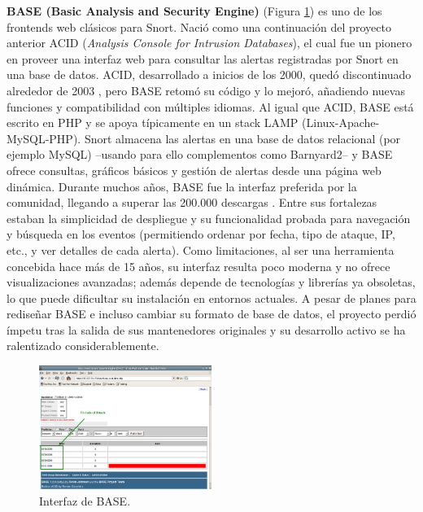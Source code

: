 \documentclass[11pt,a4paper,twoside]{report}
\begin{document}
\textbf{BASE (Basic Analysis and Security Engine)} (Figura \ref{fig:base-interface}) es uno de los frontends web clásicos para Snort. Nació como una continuación del proyecto anterior ACID (\textit{Analysis Console for Intrusion Databases}), el cual fue un pionero en proveer una interfaz web para consultar las alertas registradas por Snort en una base de datos. ACID, desarrollado a inicios de los 2000, quedó discontinuado alrededor de 2003 \cite{SnorbyHelpnet2010}, pero BASE retomó su código y lo mejoró, añadiendo nuevas funciones y compatibilidad con múltiples idiomas. Al igual que ACID, BASE está escrito en PHP y se apoya típicamente en un stack LAMP (Linux-Apache-MySQL-PHP). Snort almacena las alertas en una base de datos relacional (por ejemplo MySQL) –usando para ello complementos como Barnyard2– y BASE ofrece consultas, gráficos básicos y gestión de alertas desde una página web dinámica. Durante muchos años, BASE fue la interfaz preferida por la comunidad, llegando a superar las 200.000 descargas \cite{base-sourceforge}. Entre sus fortalezas estaban la simplicidad de despliegue y su funcionalidad probada para navegación y búsqueda en los eventos (permitiendo ordenar por fecha, tipo de ataque, IP, etc., y ver detalles de cada alerta). Como limitaciones, al ser una herramienta concebida hace más de 15 años, su interfaz resulta poco moderna y no ofrece visualizaciones avanzadas; además depende de tecnologías y librerías ya obsoletas, lo que puede dificultar su instalación en entornos actuales. A pesar de planes para rediseñar BASE e incluso cambiar su formato de base de datos, el proyecto perdió ímpetu tras la salida de sus mantenedores originales y su desarrollo activo se ha ralentizado considerablemente.

\begin{figure}[H]
	\centering
	\includegraphics[width=0.5\textwidth]{documento/18.png}
	\caption{Interfaz de BASE.}
	\label{fig:base-interface}
\end{figure}
\end{document}
